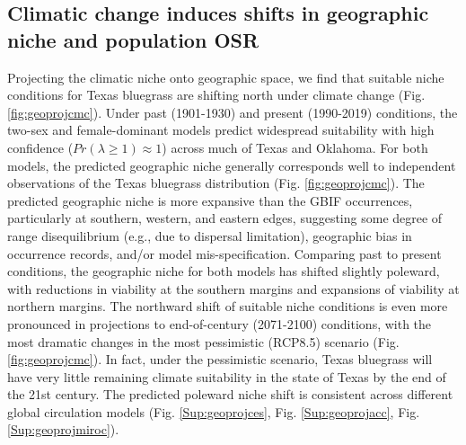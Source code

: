\documentclass[12pt]{article}\usepackage[]{graphicx}\usepackage[dvipsnames]{xcolor}
\begin{document}
\subsection*{Climatic change induces shifts in geographic niche and population OSR}
Projecting the climatic niche onto geographic space, we find that suitable niche conditions for Texas bluegrass are shifting north under climate change (Fig. \ref{fig:geoprojcmc}). 
Under past (1901-1930) and present (1990-2019) conditions, the two-sex and female-dominant models predict widespread suitability with high confidence ($Pr(\lambda \ge 1) \approx 1$) across much of Texas and Oklahoma. 
For both models, the predicted geographic niche generally corresponds well to independent observations of the Texas bluegrass distribution (Fig. \ref{fig:geoprojcmc}).
The predicted geographic niche is more expansive than the GBIF occurrences, particularly at southern, western, and eastern edges, suggesting some degree of range disequilibrium (e.g., due to dispersal limitation), geographic bias in occurrence records, and/or model mis-specification. 
Comparing past to present conditions, the geographic niche for both models has shifted slightly poleward, with reductions in viability at the southern margins and expansions of viability at northern margins. 
The northward shift of suitable niche conditions is even more pronounced in projections to end-of-century (2071-2100) conditions, with the most dramatic changes in the most pessimistic (RCP8.5) scenario (Fig. \ref{fig:geoprojcmc}). 
In fact, under the pessimistic scenario, Texas bluegrass will have very little remaining climate suitability in the state of Texas by the end of the 21st century. 
The predicted poleward niche shift is consistent across different global circulation models (Fig. \ref{Sup:geoprojces}, Fig. \ref{Sup:geoprojacc}, Fig. \ref{Sup:geoprojmiroc}). 
\end{document}
